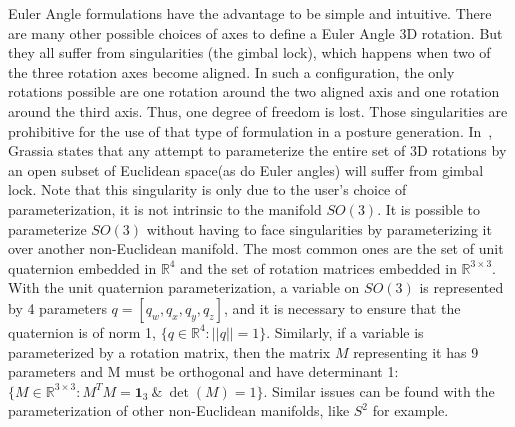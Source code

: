 Euler Angle formulations have the advantage to be simple and intuitive.
There are many other possible choices of axes to define a Euler Angle 3D rotation.
But they all suffer from singularities (the gimbal lock), which happens when two of the three rotation axes become aligned.
In such a configuration, the only rotations possible are one rotation around the two aligned axis and one rotation around the third axis.
Thus, one degree of freedom is lost.
Those singularities are prohibitive for the use of that type of formulation in a posture generation.
In~\cite{grassia1998}, Grassia states that any attempt to parameterize the entire set of 3D rotations by an open subset of Euclidean space(as do Euler angles) will suffer from gimbal lock.
Note that this singularity is only due to the user's choice of parameterization, it is not intrinsic to the manifold $SO(3)$.
It is possible to parameterize $SO(3)$ without having to face singularities by parameterizing it over another non-Euclidean manifold.
The most common ones are the set of unit quaternion embedded in $\mathbb{R}^4$ and the set of rotation matrices embedded in $\mathbb{R}^{3\times 3}$.
With the unit quaternion parameterization, a variable on $SO(3)$ is represented by 4 parameters $q = [q_w, q_x, q_y, q_z]$, and it is necessary to ensure that the quaternion is of norm 1, $\{q\in\mathbb{R}^4:||q||=1\}$.
Similarly, if a variable is parameterized by a rotation matrix, then the matrix $M$ representing it has 9 parameters and M must be orthogonal and have determinant 1: $\{M\in\mathbb{R}^{3\times 3}:M^T M = \mathbf{1}_3\  \&\ \det (M) = 1\}$.
Similar issues can be found with the parameterization of other non-Euclidean manifolds, like $S^2$ for example.

